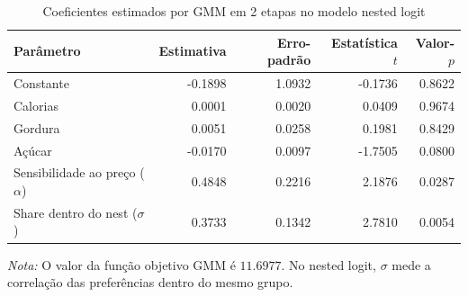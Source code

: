 
\begingroup
\begin{table}[H]
\centering
\caption{Coeficientes estimados por GMM em 2 etapas no modelo nested logit}
\label{tab:coef-nested-gmm2}
\small
\begin{tabular}{lrrrr}
\toprule
Parâmetro & Estimativa & Erro-padrão & Estatística $t$ & Valor-$p$ \\
\midrule
Constante & -0.1898 & 1.0932 & -0.1736 & 0.8622 \\
Calorias & 0.0001 & 0.0020 & 0.0409 & 0.9674 \\
Gordura & 0.0051 & 0.0258 & 0.1981 & 0.8429 \\
Açúcar & -0.0170 & 0.0097 & -1.7505 & 0.0800 \\
Sensibilidade ao preço ($\alpha$) & 0.4848 & 0.2216 & 2.1876 & 0.0287 \\
Share dentro do nest ($\sigma$) & 0.3733 & 0.1342 & 2.7810 & 0.0054 \\
\bottomrule
\end{tabular}

\vspace{0.3em}
\footnotesize
\textit{Nota:} O valor da função objetivo GMM é $11.6977$. No nested logit, $\sigma$ mede a correlação das preferências dentro do mesmo grupo.
\end{table}
\endgroup

